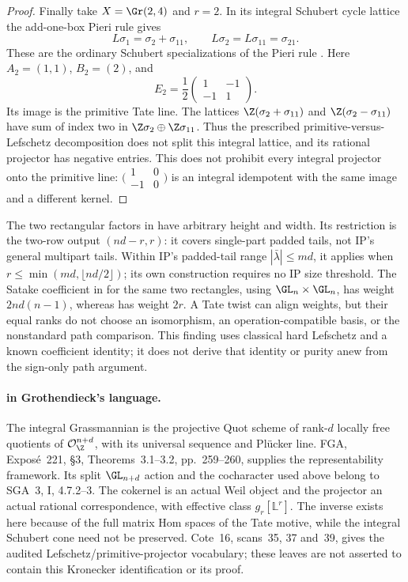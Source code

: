 \begin{proof}
Finally take $X=\Gr(2,4)$ and $r=2$. In its integral Schubert
cycle lattice the add-one-box Pieri rule gives
\[
 L\sigma_1=\sigma_2+\sigma_{11},\qquad
 L\sigma_2=L\sigma_{11}=\sigma_{21}.
\]
These are the ordinary Schubert specializations of the Pieri rule
\cite[Theorem~7.10, p.~16]{Pieri}. Here $A_2=(1,1)$, $B_2=(2)$,
and
\[
 E_2=\frac12
 \begin{pmatrix}1&-1\\-1&1\end{pmatrix}.
\]
Its image is the primitive Tate line. The lattices
$\Z(\sigma_2+\sigma_{11})$ and
$\Z(\sigma_2-\sigma_{11})$ have sum of index two in
$\Z\sigma_2\oplus\Z\sigma_{11}$. Thus the prescribed
primitive-versus-Lefschetz decomposition does not split this
integral lattice, and its rational projector has negative entries.
This does not prohibit every integral projector onto the primitive
line: $\bigl(\begin{smallmatrix}1&0\\-1&0\end{smallmatrix}\bigr)$
is an integral idempotent with the same image and a different kernel.
\end{proof}

The two rectangular factors in  have arbitrary height and
width. Its restriction is the two-row output $(nd-r,r)$: it covers
single-part padded tails, not IP's general multipart tails. Within
IP's padded-tail range $|\bar\lambda|\le md$, it applies when
$r\le\min(md,\lfloor nd/2\rfloor)$; its own construction requires
no IP size threshold. The Satake coefficient in  for the
same two rectangles, using $\GL_n\times\GL_n$, has weight
$2nd(n-1)$, whereas  has weight $2r$. A Tate twist can
align weights, but their equal ranks do not choose an isomorphism,
an operation-compatible basis, or the nonstandard path comparison.
This finding uses classical hard Lefschetz and a known coefficient
identity; it does not derive that identity or purity anew from the
sign-only path argument.

\paragraph{ in Grothendieck's language.}
The integral Grassmannian is the projective Quot scheme of
rank-$d$ locally free quotients of $\mathcal O_{\Z}^{n+d}$,
with its universal sequence and Pl\"ucker line. FGA, Expos\'e~221,
\S3, Theorems~3.1--3.2, pp.~259--260, supplies the representability
framework. Its split $\GL_{n+d}$ action and the cocharacter used
above belong to SGA~3, I, 4.7.2--3. The cokernel is an actual
Weil object and the projector an actual rational correspondence,
with effective class $g_r[\mathbb L^r]$. The inverse exists here
because of the full matrix Hom spaces of the Tate motive, while
the integral Schubert cone need not be preserved. Cote~16,
scans~35, 37 and~39, gives the audited Lefschetz/primitive-projector
vocabulary; these leaves are not asserted to contain this
Kronecker identification or its proof.

